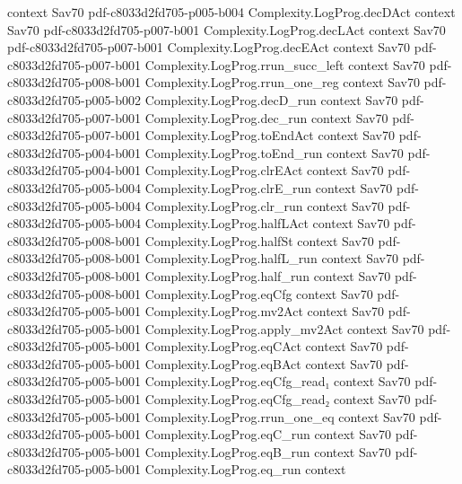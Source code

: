 \begin{theorem}
  {context}
  {Sav70}
  {pdf-c8033d2fd705-p005-b004}
\proofstep
  {Complexity.LogProg.decDAct}
  {context}
  {Sav70}
  {pdf-c8033d2fd705-p007-b001}
\proofstep
  {Complexity.LogProg.decLAct}
  {context}
  {Sav70}
  {pdf-c8033d2fd705-p007-b001}
\proofstep
  {Complexity.LogProg.decEAct}
  {context}
  {Sav70}
  {pdf-c8033d2fd705-p007-b001}
\proofstep
  {Complexity.LogProg.rrun_succ_left}
  {context}
  {Sav70}
  {pdf-c8033d2fd705-p008-b001}
\proofstep
  {Complexity.LogProg.rrun_one_reg}
  {context}
  {Sav70}
  {pdf-c8033d2fd705-p005-b002}
\proofstep
  {Complexity.LogProg.decD_run}
  {context}
  {Sav70}
  {pdf-c8033d2fd705-p007-b001}
\proofstep
  {Complexity.LogProg.dec_run}
  {context}
  {Sav70}
  {pdf-c8033d2fd705-p007-b001}
\proofstep
  {Complexity.LogProg.toEndAct}
  {context}
  {Sav70}
  {pdf-c8033d2fd705-p004-b001}
\proofstep
  {Complexity.LogProg.toEnd_run}
  {context}
  {Sav70}
  {pdf-c8033d2fd705-p004-b001}
\proofstep
  {Complexity.LogProg.clrEAct}
  {context}
  {Sav70}
  {pdf-c8033d2fd705-p005-b004}
\proofstep
  {Complexity.LogProg.clrE_run}
  {context}
  {Sav70}
  {pdf-c8033d2fd705-p005-b004}
\proofstep
  {Complexity.LogProg.clr_run}
  {context}
  {Sav70}
  {pdf-c8033d2fd705-p005-b004}
\proofstep
  {Complexity.LogProg.halfLAct}
  {context}
  {Sav70}
  {pdf-c8033d2fd705-p008-b001}
\proofstep
  {Complexity.LogProg.halfSt}
  {context}
  {Sav70}
  {pdf-c8033d2fd705-p008-b001}
\proofstep
  {Complexity.LogProg.halfL_run}
  {context}
  {Sav70}
  {pdf-c8033d2fd705-p008-b001}
\proofstep
  {Complexity.LogProg.half_run}
  {context}
  {Sav70}
  {pdf-c8033d2fd705-p008-b001}
\proofstep
  {Complexity.LogProg.eqCfg}
  {context}
  {Sav70}
  {pdf-c8033d2fd705-p005-b001}
\proofstep
  {Complexity.LogProg.mv2Act}
  {context}
  {Sav70}
  {pdf-c8033d2fd705-p005-b001}
\proofstep
  {Complexity.LogProg.apply_mv2Act}
  {context}
  {Sav70}
  {pdf-c8033d2fd705-p005-b001}
\proofstep
  {Complexity.LogProg.eqCAct}
  {context}
  {Sav70}
  {pdf-c8033d2fd705-p005-b001}
\proofstep
  {Complexity.LogProg.eqBAct}
  {context}
  {Sav70}
  {pdf-c8033d2fd705-p005-b001}
\proofstep
  {Complexity.LogProg.eqCfg_read₁}
  {context}
  {Sav70}
  {pdf-c8033d2fd705-p005-b001}
\proofstep
  {Complexity.LogProg.eqCfg_read₂}
  {context}
  {Sav70}
  {pdf-c8033d2fd705-p005-b001}
\proofstep
  {Complexity.LogProg.rrun_one_eq}
  {context}
  {Sav70}
  {pdf-c8033d2fd705-p005-b001}
\proofstep
  {Complexity.LogProg.eqC_run}
  {context}
  {Sav70}
  {pdf-c8033d2fd705-p005-b001}
\proofstep
  {Complexity.LogProg.eqB_run}
  {context}
  {Sav70}
  {pdf-c8033d2fd705-p005-b001}
\proofstep
  {Complexity.LogProg.eq_run}
  {context}

\end{theorem}
